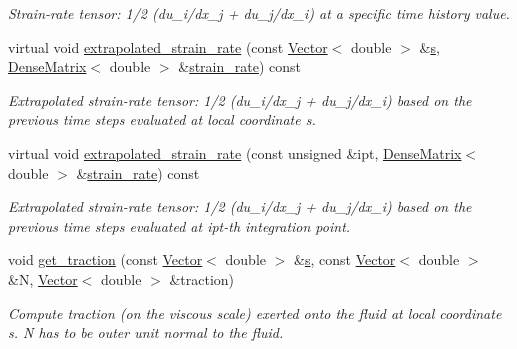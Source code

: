 \begin{DoxyCompactItemize}
\begin{DoxyCompactList}\small\item\em Strain-\/rate tensor\+: 1/2 (du\+\_\+i/dx\+\_\+j + du\+\_\+j/dx\+\_\+i) at a specific time history value. \end{DoxyCompactList}\item 
virtual void \hyperlink{classoomph_1_1GeneralisedNewtonianNavierStokesEquations_a33b963729db69fa1e4054168b3a15ccb}{extrapolated\+\_\+strain\+\_\+rate} (const \hyperlink{classoomph_1_1Vector}{Vector}$<$ double $>$ \&\hyperlink{cfortran_8h_ab7123126e4885ef647dd9c6e3807a21c}{s}, \hyperlink{classoomph_1_1DenseMatrix}{Dense\+Matrix}$<$ double $>$ \&\hyperlink{classoomph_1_1GeneralisedNewtonianNavierStokesEquations_a2ea3e797f3c7aceb7e3f12188746818c}{strain\+\_\+rate}) const
\begin{DoxyCompactList}\small\item\em Extrapolated strain-\/rate tensor\+: 1/2 (du\+\_\+i/dx\+\_\+j + du\+\_\+j/dx\+\_\+i) based on the previous time steps evaluated at local coordinate s. \end{DoxyCompactList}\item 
virtual void \hyperlink{classoomph_1_1GeneralisedNewtonianNavierStokesEquations_a187db87e3f45c39225b2b0ad657694ae}{extrapolated\+\_\+strain\+\_\+rate} (const unsigned \&ipt, \hyperlink{classoomph_1_1DenseMatrix}{Dense\+Matrix}$<$ double $>$ \&\hyperlink{classoomph_1_1GeneralisedNewtonianNavierStokesEquations_a2ea3e797f3c7aceb7e3f12188746818c}{strain\+\_\+rate}) const
\begin{DoxyCompactList}\small\item\em Extrapolated strain-\/rate tensor\+: 1/2 (du\+\_\+i/dx\+\_\+j + du\+\_\+j/dx\+\_\+i) based on the previous time steps evaluated at ipt-\/th integration point. \end{DoxyCompactList}\item 
void \hyperlink{classoomph_1_1GeneralisedNewtonianNavierStokesEquations_a27a320f14e11c9d1574073e447558946}{get\+\_\+traction} (const \hyperlink{classoomph_1_1Vector}{Vector}$<$ double $>$ \&\hyperlink{cfortran_8h_ab7123126e4885ef647dd9c6e3807a21c}{s}, const \hyperlink{classoomph_1_1Vector}{Vector}$<$ double $>$ \&N, \hyperlink{classoomph_1_1Vector}{Vector}$<$ double $>$ \&traction)
\begin{DoxyCompactList}\small\item\em Compute traction (on the viscous scale) exerted onto the fluid at local coordinate s. N has to be outer unit normal to the fluid. \end{DoxyCompactList}\item 

\end{DoxyCompactItemize}
